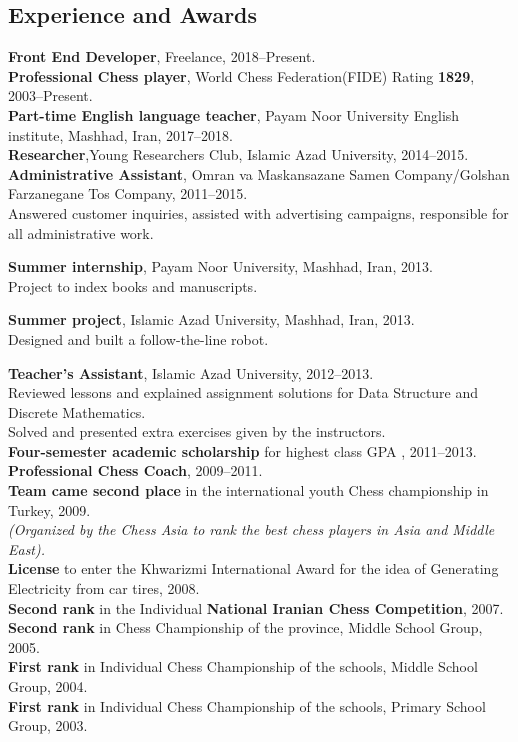 \documentclass[10pt]{article}
\begin{document}
\subsection*{Experience and Awards}
\textbf {Front End Developer}, Freelance, 2018--Present.\\
\noindent\textbf {Professional Chess player},  World Chess Federation(FIDE) Rating\textbf{ 1829}, 2003--Present.\\
\textbf {Part-time English language teacher}, Payam Noor University English institute, Mashhad, Iran, 2017--2018.\\
\noindent\textbf {Researcher},Young Researchers Club, Islamic Azad University, 2014--2015.\\
\noindent\textbf{Administrative Assistant}, Omran va Maskansazane Samen Company/Golshan Farzanegane Tos Company, 2011--2015.\\
\indent Answered customer inquiries, assisted with advertising campaigns, responsible for all administrative work.

\noindent\textbf{Summer internship}, Payam Noor University, Mashhad, Iran, 2013.\\
\indent Project to index books and manuscripts.

\noindent\textbf{Summer project}, Islamic Azad University, Mashhad, Iran, 2013.\\
\indent Designed and built a follow-the-line robot.

\noindent\textbf{Teacher’s Assistant}, Islamic Azad University, 2012--2013.\\
\indent Reviewed lessons and explained assignment solutions for Data Structure and Discrete Mathematics.\\
\indent Solved and presented extra exercises given by the instructors.\\
\textbf{Four-semester academic scholarship} for highest class GPA , 2011--2013.\\
\noindent\textbf {Professional Chess Coach}, 2009--2011.\\
\textbf{Team came second place} in the international youth Chess championship in Turkey, 2009.\\ \indent \textit {(Organized by the Chess Asia to rank the best chess players in Asia and Middle East).} \\
\noindent\textbf {License }to enter the Khwarizmi International Award for the idea of Generating Electricity from car tires, 2008.\\
\textbf{Second rank} in the Individual \textbf{National Iranian Chess Competition}, 2007.\\
\textbf{Second rank} in Chess Championship of the province, Middle School Group, 2005.\\
\textbf{First rank} in Individual Chess Championship of the schools, Middle School Group, 2004.\\
\textbf{First rank} in Individual Chess Championship of the schools, Primary School Group, 2003.
\end{document}
